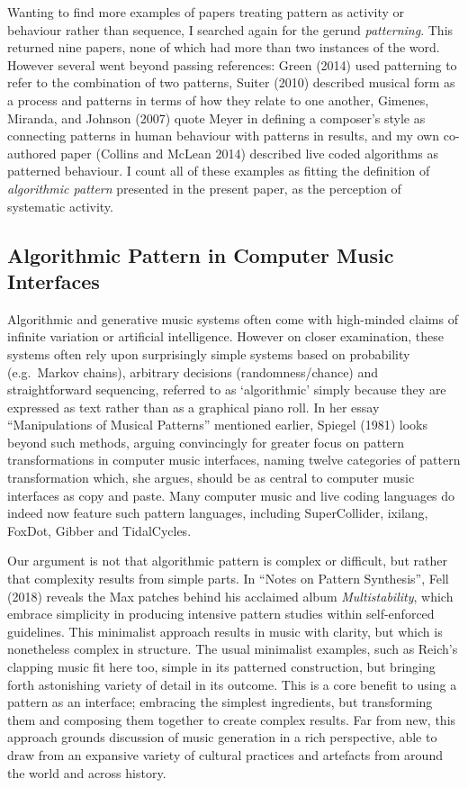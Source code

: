 \documentclass{nime-alternate} %
\begin{document}
Wanting to find more examples of papers treating pattern as activity or
behaviour rather than sequence, I searched again for the gerund
\emph{patterning}. This returned nine papers, none of which had more
than two instances of the word. However several went beyond passing
references: Green (2014) used patterning to refer to the combination of
two patterns, Suiter (2010) described musical form as a process and
patterns in terms of how they relate to one another, Gimenes, Miranda,
and Johnson (2007) quote Meyer in defining a composer's style as
connecting patterns in human behaviour with patterns in results, and my
own co-authored paper (Collins and McLean 2014) described live coded
algorithms as patterned behaviour. I count all of these examples as
fitting the definition of \emph{algorithmic pattern} presented in the
present paper, as the perception of systematic activity.

\hypertarget{algorithmic-pattern-in-computer-music-interfaces}{%
\subsection{Algorithmic Pattern in Computer Music
Interfaces}\label{algorithmic-pattern-in-computer-music-interfaces}}

Algorithmic and generative music systems often come with high-minded
claims of infinite variation or artificial intelligence. However on
closer examination, these systems often rely upon surprisingly simple
systems based on probability (e.g.~Markov chains), arbitrary decisions
(randomness/chance) and straightforward sequencing, referred to as
`algorithmic' simply because they are expressed as text rather than as a
graphical piano roll. In her essay ``Manipulations of Musical Patterns''
mentioned earlier, Spiegel (1981) looks beyond such methods, arguing
convincingly for greater focus on pattern transformations in computer
music interfaces, naming twelve categories of pattern transformation
which, she argues, should be as central to computer music interfaces as
copy and paste. Many computer music and live coding languages do indeed
now feature such pattern languages, including SuperCollider, ixilang,
FoxDot, Gibber and TidalCycles.

Our argument is not that algorithmic pattern is complex or difficult,
but rather that complexity results from simple parts. In ``Notes on
Pattern Synthesis'', Fell (2018) reveals the Max patches behind his
acclaimed album \emph{Multistability}, which embrace simplicity in
producing intensive pattern studies within self-enforced guidelines.
This minimalist approach results in music with clarity, but which is
nonetheless complex in structure. The usual minimalist examples, such as
Reich's clapping music fit here too, simple in its patterned
construction, but bringing forth astonishing variety of detail in its
outcome. This is a core benefit to using a pattern as an interface;
embracing the simplest ingredients, but transforming them and composing
them together to create complex results. Far from new, this approach
grounds discussion of music generation in a rich perspective, able to
draw from an expansive variety of cultural practices and artefacts from
around the world and across history.
\end{document}
